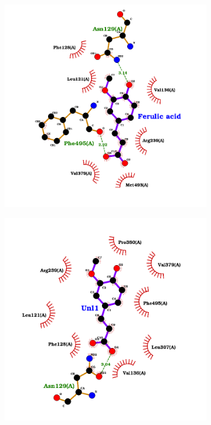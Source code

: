 \documentclass[12pt]{article}
\begin{document}
\begin{figure}[h!]
\begin{subfigure}[h!]{0.35\textwidth}
			\caption{}
		\end{subfigure}
		\hfill
		\begin{subfigure}[h!]{0.35\textwidth}
			\hspace{2cm}
			\includegraphics[width=\textwidth]{../5/known/Dock/Dock2/best3.png}
			\caption{}
		\end{subfigure}
		\hfill
		\begin{subfigure}[h!]{0.35\textwidth}
			\hspace{-2cm}
			\includegraphics[width=\textwidth]{../5/known/Dock/Dock2/best4.png}

\end{subfigure}
\end{figure}
\end{document}
